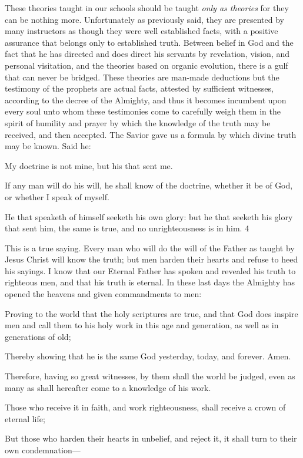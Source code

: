 These theories taught in our schools should be taught \textit{only as theories} for they can be nothing
more. Unfortunately as previously said, they are presented by many instructors as though
they were well established facts, with a positive assurance that belongs only to established
truth. Between belief in God and the fact that he has directed and does direct his servants by
revelation, vision, and personal visitation, and the theories based on organic evolution, there
is a gulf that can never be bridged. These theories are man-made deductions but the
testimony of the prophets are actual facts, attested by sufficient witnesses, according to the
decree of the Almighty, and thus it becomes incumbent upon every soul unto whom these
testimonies come to carefully weigh them in the spirit of humility and prayer by which the
knowledge of the truth may be received, and then accepted. The Savior gave us a formula by
which divine truth may be known. Said he:

My doctrine is not mine, but his that sent me.

If any man will do his will, he shall know of the doctrine, whether it be of God, or whether I
speak of myself.

He that speaketh of himself seeketh his own glory: but he that seeketh his glory that sent him,
the same is true, and no unrighteousness is in him. 4

This is a true saying. Every man who will do the will of the Father as taught by Jesus Christ
will know the truth; but men harden their hearts and refuse to heed his sayings. I know that
our Eternal Father has spoken and revealed his truth to righteous men, and that his truth is
eternal. In these last days the Almighty has opened the heavens and given commandments to
men:

Proving to the world that the holy scriptures are true, and that God does inspire men and call
them to his holy work in this age and generation, as well as in generations of old;

Thereby showing that he is the same God yesterday, today, and forever. Amen.

Therefore, having so great witnesses, by them shall the world be judged, even as many as
shall hereafter come to a knowledge of his work.

Those who receive it in faith, and work righteousness, shall receive a crown of eternal life;

But those who harden their hearts in unbelief, and reject it, it shall turn to their own
condemnation—

